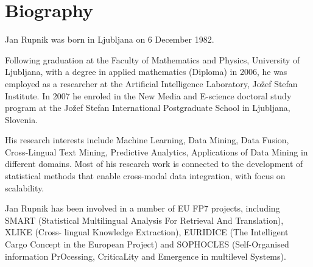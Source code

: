 %
\chapter{Biography}

Jan Rupnik was born in Ljubljana on 6 December 1982.

Following graduation at the Faculty of Mathematics and Physics, University of Ljubljana,
with a degree in applied mathematics (Diploma) in 2006, he was employed as a researcher
at the Artificial Intelligence Laboratory, Jožef Stefan Institute. In 2007 he
enroled in the New Media and E-science doctoral study program at the Jožef Stefan
International Postgraduate School in Ljubljana, Slovenia.

His research interests include Machine Learning, Data Mining, Data
Fusion, Cross-Lingual Text Mining, Predictive Analytics, Applications of Data Mining
in different domains. Most of his research work is connected to the development of
statistical methods that enable cross-modal data integration, with focus on
scalability.

Jan Rupnik has been involved in a number of EU FP7 projects, including
SMART (Statistical Multilingual Analysis For Retrieval And Translation), XLIKE (Cross-
lingual Knowledge Extraction), EURIDICE (The Intelligent Cargo Concept in the
European Project) and SOPHOCLES (Self-Organised information PrOcessing,
CriticaLity and Emergence in multilevel Systems).